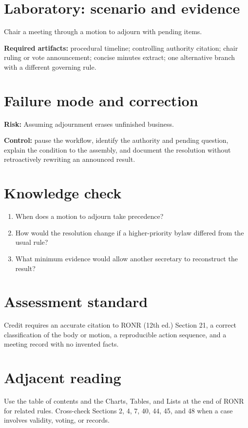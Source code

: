 \documentclass[11pt]{article}
\begin{document}
\section{Laboratory: scenario and evidence}
Chair a meeting through a motion to adjourn with pending items.

\textbf{Required artifacts:} procedural timeline; controlling authority citation; chair ruling or vote announcement; concise minutes extract; one alternative branch with a different governing rule.

\section{Failure mode and correction}
\textbf{Risk:} Assuming adjournment erases unfinished business.

\textbf{Control:} pause the workflow, identify the authority and pending question, explain the condition to the assembly, and document the resolution without retroactively rewriting an announced result.

\section{Knowledge check}
\begin{enumerate}[leftmargin=*,itemsep=4pt]
\item When does a motion to adjourn take precedence?
\item How would the resolution change if a higher-priority bylaw differed from the usual rule?
\item What minimum evidence would allow another secretary to reconstruct the result?
\end{enumerate}

\section{Assessment standard}
Credit requires an accurate citation to RONR (12th ed.) Section 21, a correct classification of the body or motion, a reproducible action sequence, and a meeting record with no invented facts.

\section{Adjacent reading}
Use the table of contents and the Charts, Tables, and Lists at the end of RONR for related rules. Cross-check Sections 2, 4, 7, 40, 44, 45, and 48 when a case involves validity, voting, or records.
\end{document}
